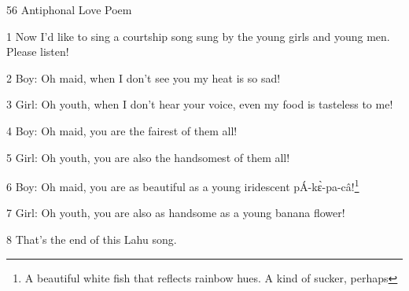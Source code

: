 
56 Antiphonal Love Poem

1 Now I'd like to sing a courtship song sung by the young girls and young men.
Please listen!

2 Boy: Oh maid, when I don't see you my heat is so sad!

3 Girl: Oh youth, when I don't hear your voice, even my food is tasteless to me!

4 Boy: Oh maid, you are the fairest of them all!

5 Girl: Oh youth, you are also the handsomest of them all!

6 Boy: Oh maid, you are as beautiful as a young iridescent pÁ-kɛ̀-pa-câ!\footnote{A beautiful white fish that reflects rainbow hues. A kind of sucker, perhaps}

7 Girl: Oh youth, you are also as handsome as a young banana flower!

8 That's the end of this Lahu song.

